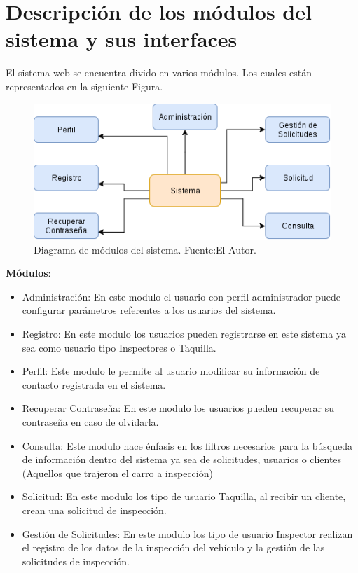 \section{Descripción de los módulos del sistema y sus interfaces } 
\setlength{\parskip}{5mm}
El sistema web se encuentra divido en varios módulos. Los cuales están representados en la siguiente Figura.
\setlength{\parskip}{0mm}
\begin{figure}[H]
\begin{center}
	\includegraphics[width=\textwidth]{img/modulos_del_sistema.png}
\end{center}
\caption{Diagrama de módulos del sistema. Fuente:El Autor.}
\label{fig:Modulos_del_sistema}
\end{figure}


\textbf{Módulos}:
\begin{itemize}
	\item Administración: En este modulo el usuario con perfil administrador puede configurar parámetros referentes a los usuarios del sistema.
	
	\item Registro: En este modulo los usuarios pueden registrarse en este sistema ya sea como usuario tipo Inspectores o Taquilla.
	
	\item Perfil: Este modulo le permite al usuario modificar su información de contacto registrada en el sistema.
	
	\item Recuperar Contraseña: En este modulo los usuarios pueden recuperar su contraseña en caso de olvidarla. 
	
	\item Consulta: Este modulo hace énfasis en los filtros necesarios para la búsqueda de información dentro del sistema ya sea de solicitudes, usuarios o clientes (Aquellos que trajeron el carro a inspección)
	
	\item Solicitud: En este modulo los tipo de usuario Taquilla, al recibir un cliente, crean una solicitud de inspección.
	
	\item Gestión de Solicitudes: En este modulo los tipo de usuario Inspector realizan el registro de los datos de la inspección del vehículo y la gestión de las solicitudes de inspección.
	

\end{itemize}


